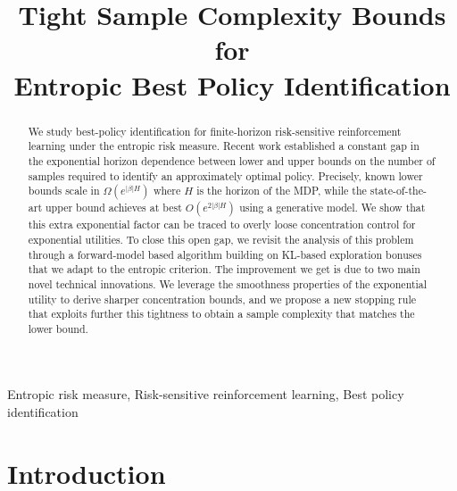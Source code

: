\documentclass[final,12pt]{colt2026} %
\title[Entropic Best Policy Identification]{Tight Sample Complexity Bounds for \\
Entropic Best Policy Identification}
\begin{document}
\maketitle

\begin{abstract}%
 We study best-policy identification for finite-horizon risk-sensitive reinforcement learning under the entropic risk measure. Recent work established a constant gap in the exponential horizon dependence between lower and upper bounds on the number of samples required to identify an approximately optimal policy. Precisely, known lower bounds scale in $\Omega(e^{|\beta| H})$ where $H$ is the horizon of the MDP, while the state-of-the-art upper bound achieves at best $O(e^{2|\beta| H})$ \citep{MortensenTalebi2025} using a generative model. We show that this extra exponential factor can be traced to overly loose concentration control for exponential utilities. To close this open gap, we revisit the analysis of this problem through a forward-model based algorithm building on KL-based exploration bonuses that we adapt to the entropic criterion. The improvement we get is due to two main novel technical innovations. We leverage the smoothness properties of the exponential utility to derive sharper concentration bounds, and we propose a new stopping rule that exploits further this tightness to obtain a sample complexity that matches the lower bound.
\end{abstract}

\begin{keywords}%
  Entropic risk measure, Risk-sensitive reinforcement learning, Best policy identification
\end{keywords}

\section{Introduction}
\end{document}

